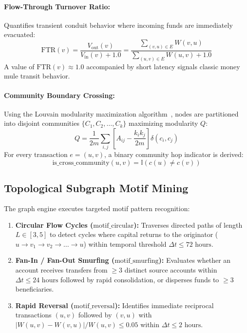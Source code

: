 \paragraph{Flow-Through Turnover Ratio:}
Quantifies transient conduit behavior where incoming funds are immediately evacuated:
\begin{equation}
    \text{FTR}(v) = \frac{V_{\text{out}}(v)}{V_{\text{in}}(v) + 1.0} = \frac{\sum_{(v, u) \in E} W(v, u)}{\sum_{(u, v) \in E} W(u, v) + 1.0}
\end{equation}
A value of $\text{FTR}(v) \approx 1.0$ accompanied by short latency signals classic money mule transit behavior.

\paragraph{Community Boundary Crossing:}
Using the Louvain modularity maximization algorithm~\cite{blondel2008fast}, nodes are partitioned into disjoint communities $\{C_1, C_2, \dots, C_k\}$ maximizing modularity $Q$:
\begin{equation}
    Q = \frac{1}{2m} \sum_{i,j} \left[ A_{ij} - \frac{k_i k_j}{2m} \right] \delta(c_i, c_j)
\end{equation}
For every transaction $e = (u, v)$, a binary community hop indicator is derived:
\begin{equation}
    \text{is\_cross\_community}(u, v) = \mathbb{I}(c(u) \neq c(v))
\end{equation}

\subsection{Topological Subgraph Motif Mining}
The graph engine executes targeted motif pattern recognition:
\begin{enumerate}
    \item \textbf{Circular Flow Cycles ($\text{motif\_circular}$):} Traverses directed paths of length $L \in [3, 5]$ to detect cycles where capital returns to the originator ($u \rightarrow v_1 \rightarrow v_2 \rightarrow \dots \rightarrow u$) within temporal threshold $\Delta t \le 72\text{ hours}$.
    \item \textbf{Fan-In / Fan-Out Smurfing ($\text{motif\_smurfing}$):} Evaluates whether an account receives transfers from $\ge 3$ distinct source accounts within $\Delta t \le 24\text{ hours}$ followed by rapid consolidation, or disperses funds to $\ge 3$ beneficiaries.
    \item \textbf{Rapid Reversal ($\text{motif\_reversal}$):} Identifies immediate reciprocal transactions $(u, v)$ followed by $(v, u)$ with $|W(u, v) - W(v, u)| / W(u, v) \le 0.05$ within $\Delta t \le 2\text{ hours}$.
\end{enumerate}


